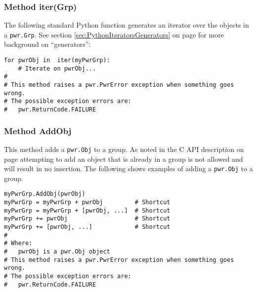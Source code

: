 \subsubsection{Method iter(Grp)} \label{meth:GenerateGroupObjs}

The following standard Python function generates an iterator over the objects
in a \texttt{pwr.Grp}. See section \ref{sec:PythonIteratorsGenerators}
on page \pageref{sec:PythonIteratorsGenerators} for more background on
``generators'':

\begin{center}\begin{minipage}{.95\linewidth}\begin{lstlisting}
for pwrObj in  iter(myPwrGrp):
    # Iterate on pwrObj...
#
# This method raises a pwr.PwrError exception when something goes wrong.
# The possible exception errors are:
#   pwr.ReturnCode.FAILURE
\end{lstlisting}\end{minipage}\end{center}

\subsubsection{Method AddObj} \label{meth:AddObj}

This method adds a \texttt{pwr.Obj} to a group. As noted in the C API
description on page \pageref{func:GrpAddObj} attempting to add an object that
is already in a group is not allowed and will result in no insertion.  The
following shows examples of adding a \texttt{pwr.Obj} to a group.

\begin{center}\begin{minipage}{.95\linewidth}\begin{lstlisting}
myPwrGrp.AddObj(pwrObj)
myPwrGrp = myPwrGrp + pwrObj         # Shortcut
myPwrGrp = myPwrGrp + [pwrObj, ...]  # Shortcut
myPwrGrp += pwrObj                   # Shortcut
myPwrGrp += [pwrObj, ...]            # Shortcut
#
# Where:
#   pwrObj is a pwr.Obj object
# This method raises a pwr.PwrError exception when something goes wrong.
# The possible exception errors are:
#   pwr.ReturnCode.FAILURE
\end{lstlisting}\end{minipage}\end{center}

